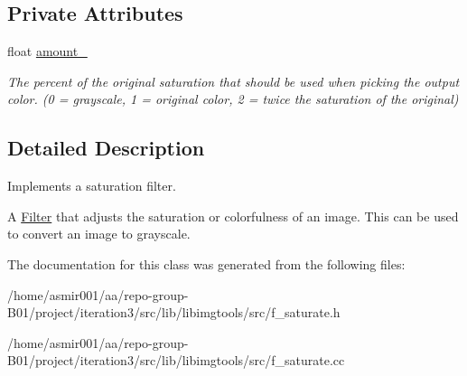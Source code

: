 \subsection*{Private Attributes}
\begin{DoxyCompactItemize}
\item 
float \hyperlink{classimage__tools_1_1FSaturate_a76f7563fdee11d37e3ac640ced26bdd6}{amount\+\_\+}\hypertarget{classimage__tools_1_1FSaturate_a76f7563fdee11d37e3ac640ced26bdd6}{}\label{classimage__tools_1_1FSaturate_a76f7563fdee11d37e3ac640ced26bdd6}

\begin{DoxyCompactList}\small\item\em The percent of the original saturation that should be used when picking the output color. (0 = grayscale, 1 = original color, 2 = twice the saturation of the original) \end{DoxyCompactList}\end{DoxyCompactItemize}


\subsection{Detailed Description}
Implements a saturation filter. 

A \hyperlink{classimage__tools_1_1Filter}{Filter} that adjusts the saturation or colorfulness of an image. This can be used to convert an image to grayscale. 

The documentation for this class was generated from the following files\+:\begin{DoxyCompactItemize}
\item 
/home/asmir001/aa/repo-\/group-\/\+B01/project/iteration3/src/lib/libimgtools/src/f\+\_\+saturate.\+h\item 
/home/asmir001/aa/repo-\/group-\/\+B01/project/iteration3/src/lib/libimgtools/src/f\+\_\+saturate.\+cc\end{DoxyCompactItemize}
